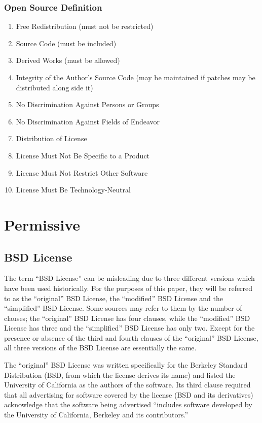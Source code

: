 \documentclass[12pt,letterpaper]{article}
\begin{document}
\subsubsection{Open Source Definition}
\begin{enumerate}
\item Free Redistribution (must not be restricted)
\item Source Code (must be included)
\item Derived Works (must be allowed)
\item Integrity of the Author's Source Code (may be maintained if patches may be distributed along side it)
\item No Discrimination Against Persons or Groups
\item No Discrimination Against Fields of Endeavor
\item Distribution of License
\item License Must Not Be Specific to a Product
\item License Must Not Restrict Other Software
\item License Must Be Technology-Neutral
\end{enumerate}

\section{Permissive}

\subsection{BSD License}

The term ``BSD License'' can be misleading due to three different versions which have been used historically. For the purposes of this paper, they will be referred to as the ``original'' BSD License, the ``modified'' BSD License and the ``simplified'' BSD License. Some sources may refer to them by the number of clauses; the ``original'' BSD License has four clauses, while the ``modified'' BSD License has three and the ``simplified'' BSD License has only two. Except for the presence or absence of the third and fourth clauses of the ``original'' BSD License, all three versions of the BSD License are essentially the same.

The ``original'' BSD License was written specifically for the Berkeley Standard Distribution (BSD, from which the license derives its name) and listed the University of California as the authors of the software. Its third clause required that all advertising for software covered by the license (BSD and its derivatives) acknowledge that the software being advertised ``includes software developed by the University of California, Berkeley and its contributors.''
\end{document}
